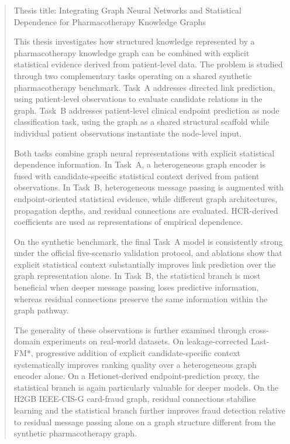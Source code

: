 \begin{abstract}
\noindent
Thesis title: Integrating Graph Neural Networks and Statistical Dependence for Pharmacotherapy Knowledge Graphs

\medskip


This thesis investigates how structured knowledge represented by a pharmacotherapy knowledge graph can
 be combined with explicit statistical evidence derived from patient-level data.
The problem is studied through two complementary tasks operating on a shared synthetic pharmacotherapy 
benchmark.
Task~A addresses directed link prediction, using patient-level observations to evaluate candidate 
relations in the graph.
Task~B addresses patient-level clinical endpoint prediction as node classification task, 
using the graph as a shared structural scaffold while individual 
patient observations instantiate the node-level input.

Both tasks combine graph neural representations with explicit statistical dependence information.
In Task~A, a heterogeneous graph encoder is fused with candidate-specific statistical context derived 
from patient observations.
In Task~B, heterogeneous message passing is augmented with endpoint-oriented statistical evidence, 
while different graph architectures, propagation depths, and residual connections are evaluated.
HCR-derived coefficients are used as representations of empirical dependence.

On the synthetic benchmark, the final Task~A model is consistently strong under 
the official five-scenario validation protocol, and ablations show that explicit 
statistical context substantially improves link prediction over the graph representation alone.
In Task~B, the statistical branch is most beneficial when deeper message passing loses predictive 
information, whereas residual connections preserve the same information within the graph pathway. 

The generality of these observations is further examined through cross-domain experiments 
on real-world datasets.
On leakage-corrected Last-FM*, progressive addition of explicit candidate-specific context 
systematically improves ranking quality over a heterogeneous graph encoder alone.
On a Hetionet-derived endpoint-prediction proxy, the statistical branch is again 
particularly valuable for deeper models.
On the H2GB IEEE-CIS-G card-fraud graph, residual connections stabilise learning and the 
statistical branch further improves fraud detection relative to residual message passing 
alone on a graph structure different from the synthetic pharmacotherapy graph.


\end{abstract}
